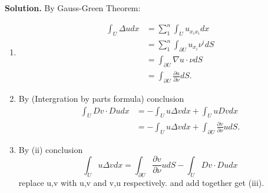 \documentclass[a4paper]{book}
\newenvironment{solution}%
{\noindent\textbf{Solution.}}%
{\qedhere}
\numberwithin{equation}{chapter}
\theoremstyle{definition}
\begin{document}
\begin{multicols}{2}
\begin{solution}
	By Gauss-Green Theorem:
	\begin{enumerate}[i]
		\item \begin{equation}\nonumber
		\begin{aligned}
		\int_U \Delta u dx &= \sum_{1}^{n} \int_U u_{x_i x_i} dx\\
		& = \sum_{1}^{n} \int_{\partial U} u_{x_i}\nu^i dS\\
		& = \int_{\partial U} \nabla u \cdot \nu dS\\
		& = \int_{\partial U} \frac{\partial u}{\partial \nu} dS.
		\end{aligned}
		\end{equation}
		
		\item  By (Intergration by parts formula) conclusion
		\begin{equation}\nonumber
			\begin{aligned}
			\int_U Dv \cdot Du dx &= - \int_U u \Delta v dx + \int_U u Dv dx  \\
			&=  - \int_U u \Delta v dx +  \int_{\partial U } \frac{\partial v}{\partial \nu} u dS.
			\end{aligned}
		\end{equation}
		
		\item  By (ii) conclusion 
		\begin{equation}\nonumber
			\int_U u \Delta v dx =  \int_{\partial U } \frac{\partial v}{\partial \nu} u dS -	\int_U Dv \cdot Du dx
		\end{equation}
		replace u,v with u,v and v,u respectively. and add together get (iii).
	\end{enumerate}
\end{solution}
\end{multicols}
\end{document}
